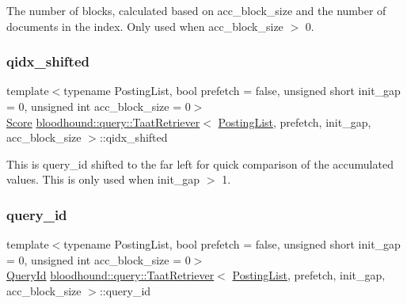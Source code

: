 The number of blocks, calculated based on acc\+\_\+block\+\_\+size and the number of documents in the index. Only used when acc\+\_\+block\+\_\+size $>$ 0. \mbox{\label{classbloodhound_1_1query_1_1TaatRetriever_aa27d16b326df60affe26e005f9abb4f6}} 
\subsubsection{\texorpdfstring{qidx\+\_\+shifted}{qidx\_shifted}}
{\footnotesize\ttfamily template$<$typename Posting\+List, bool prefetch = false, unsigned short init\+\_\+gap = 0, unsigned int acc\+\_\+block\+\_\+size = 0$>$ \\
\hyperlink{structbloodhound_1_1Score}{Score} \hyperlink{classbloodhound_1_1query_1_1TaatRetriever}{bloodhound\+::query\+::\+Taat\+Retriever}$<$ \hyperlink{classbloodhound_1_1PostingList}{Posting\+List}, prefetch, init\+\_\+gap, acc\+\_\+block\+\_\+size $>$\+::qidx\+\_\+shifted\hspace{0.3cm}{\ttfamily [protected]}}

This is query\+\_\+id shifted to the far left for quick comparison of the accumulated values. This is only used when init\+\_\+gap $>$ 1. \mbox{\label{classbloodhound_1_1query_1_1TaatRetriever_aa9a1b8ca0cb570bcffe6b6c68e8c2e20}} 
\subsubsection{\texorpdfstring{query\+\_\+id}{query\_id}}
{\footnotesize\ttfamily template$<$typename Posting\+List, bool prefetch = false, unsigned short init\+\_\+gap = 0, unsigned int acc\+\_\+block\+\_\+size = 0$>$ \\
\hyperlink{namespacebloodhound_1_1query_aa67214af106292b2483995adea986b08}{Query\+Id} \hyperlink{classbloodhound_1_1query_1_1TaatRetriever}{bloodhound\+::query\+::\+Taat\+Retriever}$<$ \hyperlink{classbloodhound_1_1PostingList}{Posting\+List}, prefetch, init\+\_\+gap, acc\+\_\+block\+\_\+size $>$\+::query\+\_\+id\hspace{0.3cm}{\ttfamily [protected]}}

